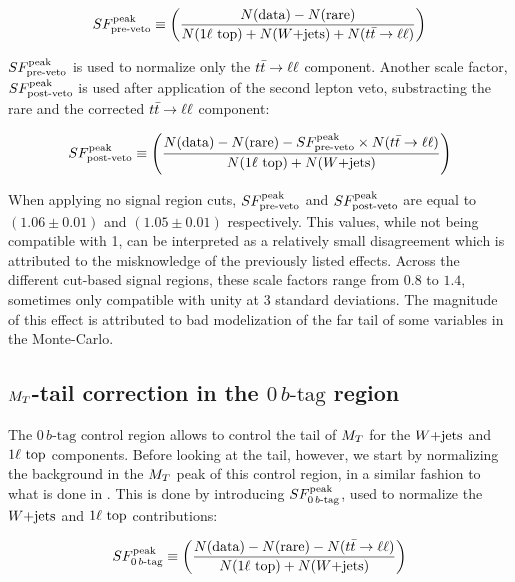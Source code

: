     \begin{equation}
        SF_{\text{pre-veto}}^{\text{peak}} \equiv \left( \frac{N(\text{data}) - N(\text{rare})}{N(1\ell~\text{top}) + N(\text{$W$+jets}) + N(t\bar{t} \rightarrow \ell \ell)} \right)
        \label{eq:SFpreDefinition}
    \end{equation}

    $SF_{\text{pre-veto}}^{\text{peak}}$ is used to normalize only the $t\bar{t} \rightarrow \ell \ell$ component. Another scale factor,
    $SF_{\text{post-veto}}^{\text{peak}}$ is used after application of the second lepton veto, substracting the rare
    and the corrected $t\bar{t} \rightarrow \ell \ell$ component:

    \begin{equation}
        SF_{\text{post-veto}}^{\text{peak}} \equiv \left( \frac{N(\text{data}) - N(\text{rare}) - SF_{\text{pre-veto}}^{\text{peak}} \times N(t\bar{t} \rightarrow \ell \ell)}{N(1\ell~\text{top}) + N(\text{$W$+jets})} \right)
        \label{eq:SFpostDefinition}
    \end{equation}

     When applying no signal region cuts, $SF_{\text{pre-veto}}^{\text{peak}}$ and $SF_{\text{post-veto}}^{\text{peak}}$ are equal to
     $(1.06 \pm 0.01)$ and $(1.05 \pm 0.01)$ respectively. This values, while not
     being compatible with 1, can be interpreted as a relatively small disagreement
     which is attributed to the misknowledge of the previously listed effects. Across the
     different cut-based signal regions, these scale factors range from $0.8$ to $1.4$,
     sometimes only compatible with unity at 3 standard deviations. The magnitude of this
     effect is attributed to bad modelization of the far tail of some variables in the
     Monte-Carlo.

        \subsection{$M_T$-tail correction in the $0\, b\text{-tag}$ region \label{sec:MTtailCorrection}}

    The $0\, b\text{-tag}$ control region allows to control the tail of $M_T$ for the $\text{$W$+jets}$ and
    $1\ell~\text{top}$ components. Before looking at the tail, however, we start by normalizing
    the background in the $M_T$ peak of this control region, in a similar fashion to what
    is done in . This is done by introducing $SF_{0\, b\text{-tag}}^{\text{peak}}$,
    used to normalize the $\text{$W$+jets}$ and $1\ell~\text{top}$ contributions:

    \begin{equation}
        SF_{0\, b\text{-tag}}^{\text{peak}} \equiv \left( \frac{N(\text{data}) - N(\text{rare}) - N(t\bar{t} \rightarrow \ell \ell)}{N(1\ell~\text{top}) + N(\text{$W$+jets})} \right)
        \label{eq:SF0btagDefinition}
    \end{equation}

